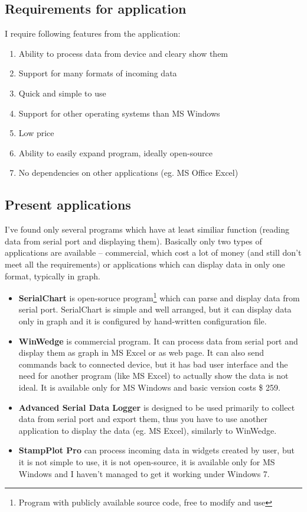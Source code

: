 \documentclass[12pt, a4paper, oneside]{article}
\begin{document}
\subsection*{Requirements for application}
I require following features from the application:
\begin{enumerate}
    \item Ability to process data from device and cleary show them %
    \item Support for many formats of incoming data%
    \item Quick and simple to use%
    \item Support for other operating systems than MS Windows %
    \item Low price%
    \item Ability to easily expand program, ideally open-source %
    \item No dependencies on other applications (eg. MS Office Excel) %
\end{enumerate}

\subsection*{Present applications}
I've found only several programs which have at least similiar function (reading data from serial port and displaying them). Basically only two types of applications are available -- commercial, which cost a lot of money (and still don't meet all the requirements) or applications which can display data in only one format, typically in graph.

\begin{itemize}
    \item {\bf SerialChart}\cite{serialchart} is open-soruce program\footnote{Program with publicly available source code, free to modify and use} which can parse and display data from serial port. SerialChart is simple and well arranged, but it can display data only in graph and it is configured by hand-written configuration file.
    \item {\bf WinWedge}\cite{winwedge} is commercial program. It can process data from serial port and display them as graph in MS Excel or as web page. It can also send commands back to connected device, but it has bad user interface and the need for another program (like MS Excel) to actually show the data is not ideal. It is available only for MS Windows and basic version costs \$ 259.
    \item {\bf Advanced Serial Data Logger}\cite{serialdatalogger} is designed to be used primarily to collect data from serial port and export them, thus you have to use another application to display the data (eg. MS Excel), similarly to WinWedge.
    \item {\bf StampPlot Pro}\cite{stamplot} can process incoming data in widgets created by user, but it is not simple to use, it is not open-source, it is available only for MS Windows and I haven't managed to get it working under Windows 7.
\end{itemize}
\end{document}
